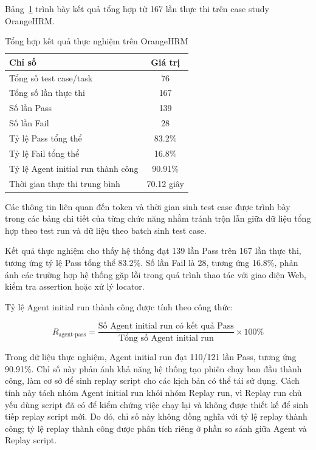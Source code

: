 Bảng~\ref{tab:chapter6_overall_result} trình bày kết quả tổng hợp từ 167 lần thực thi trên case study OrangeHRM.

\begin{table}[H]
\centering
\caption{Tổng hợp kết quả thực nghiệm trên OrangeHRM}
\label{tab:chapter6_overall_result}
\renewcommand{\arraystretch}{1.2}
\begin{tabular}{|p{8.5cm}|c|}
\hline
\textbf{Chỉ số} & \textbf{Giá trị} \\
\hline
Tổng số test case/task & 76 \\
\hline
Tổng số lần thực thi & 167 \\
\hline
Số lần Pass & 139 \\
\hline
Số lần Fail & 28 \\
\hline
Tỷ lệ Pass tổng thể & 83.2\% \\
\hline
Tỷ lệ Fail tổng thể & 16.8\% \\
\hline
Tỷ lệ Agent initial run thành công & 90.91\% \\
\hline
Thời gian thực thi trung bình & 70.12 giây \\
\hline
\end{tabular}
\end{table}

Các thông tin liên quan đến token và thời gian sinh test case được trình bày trong các bảng chi tiết của từng chức năng nhằm tránh trộn lẫn giữa dữ liệu tổng hợp theo test run và dữ liệu theo batch sinh test case.

Kết quả thực nghiệm cho thấy hệ thống đạt 139 lần Pass trên 167 lần thực thi, tương ứng tỷ lệ Pass tổng thể 83.2\%. Số lần Fail là 28, tương ứng 16.8\%, phản ánh các trường hợp hệ thống gặp lỗi trong quá trình thao tác với giao diện Web, kiểm tra assertion hoặc xử lý locator.

Tỷ lệ Agent initial run thành công được tính theo công thức:

\[
R_{\text{agent-pass}} =
\frac{\text{Số Agent initial run có kết quả Pass}}
{\text{Tổng số Agent initial run}} \times 100\%
\]

Trong dữ liệu thực nghiệm, Agent initial run đạt 110/121 lần Pass, tương ứng 90.91\%. Chỉ số này phản ánh khả năng hệ thống tạo phiên chạy ban đầu thành công, làm cơ sở để sinh replay script cho các kịch bản có thể tái sử dụng. Cách tính này tách nhóm Agent initial run khỏi nhóm Replay run, vì Replay run chủ yếu dùng script đã có để kiểm chứng việc chạy lại và không được thiết kế để sinh tiếp replay script mới. Do đó, chỉ số này không đồng nghĩa với tỷ lệ replay thành công; tỷ lệ replay thành công được phân tích riêng ở phần so sánh giữa Agent và Replay script.

